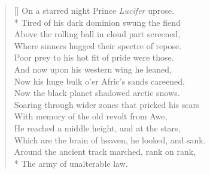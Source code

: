 \settowidth{\versewidth}{\vin \vin Around the ancient track marched, rank on rank,}
\begin{verse}[\versewidth]
On a starred night Prince \textit{Lucifer} uprose.\\*
\vin Tired of his dark dominion swung the fiend\\
\vin Above the rolling ball in cloud part screened,\\
Where sinners hugged their spectre of repose.\\
Poor prey to his hot fit of pride were those.\\
\vin And now upon his western wing he leaned,\\
\vin Now his huge bulk o'er Afric's sands careened,\\
Now the black planet shadowed arctic snows.\\
Soaring through wider zones that pricked his scars\\
\vin With memory of the old revolt from Awe,\\
He reached a middle height, and at the stars,\\
\vin \vin Which are the brain of heaven, he looked, and sank.\\
\vin \vin Around the ancient track marched, rank on rank,\\*
\vin The army of unalterable law.
\end{verse}
